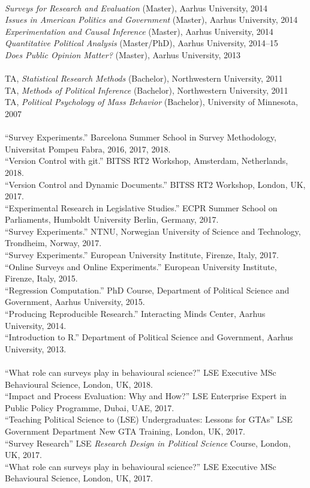 \documentclass[12pt]{article}
\newcommand{\topic}[1]{\pagebreak[3]\indent {\color{lg}{\footnotesize #1 }}\\}
\newcommand{\entry}[1]{\indent {\color{lg}\guillemotright}\hspace{2pt}#1\vspace{.25em}\\}
\begin{document}
{\topic{Lecturing: Aarhus University}
	\entry{\textit{Surveys for Research and Evaluation} (Master), Aarhus University, 2014}
	\entry{\textit{Issues in American Politics and Government} (Master), Aarhus University, 2014}
	\entry{\textit{Experimentation and Causal Inference} (Master), Aarhus University, 2014}
	\entry{\textit{Quantitative Political Analysis} (Master/PhD), Aarhus University, 2014--15}
	\entry{\textit{Does Public Opinion Matter?} (Master), Aarhus University, 2013}

\topic{Class Teaching: Northwestern University}
	\entry{TA, \textit{Statistical Research Methods} (Bachelor), Northwestern University, 2011} %
	\entry{TA, \textit{Methods of Political Inference} (Bachelor), Northwestern University, 2011} %
	\entry{TA, \textit{Political Psychology of Mass Behavior} (Bachelor), University of Minnesota, 2007} %

\topic{Short Courses}
	\entry{``Survey Experiments.'' Barcelona Summer School in Survey Methodology, Universitat Pompeu Fabra, 2016, 2017, 2018.}
	\entry{``Version Control with git.'' BITSS RT2 Workshop, Amsterdam, Netherlands, 2018.}
    \entry{``Version Control and Dynamic Documents.'' BITSS RT2 Workshop, London, UK, 2017.}
    \entry{``Experimental Research in Legislative Studies.'' ECPR Summer School on Parliaments, Humboldt University Berlin, Germany, 2017.}
    \entry{``Survey Experiments.'' NTNU, Norwegian University of Science and Technology, Trondheim, Norway, 2017.}
	\entry{``Survey Experiments.'' European University Institute, Firenze, Italy, 2017.}
	\entry{``Online Surveys and Online Experiments.'' European University Institute, Firenze, Italy, 2015.}
	\entry{``Regression Computation.'' PhD Course, Department of Political Science and Government, Aarhus University, 2015.}
	\entry{``Producing Reproducible Research.'' Interacting Minds Center, Aarhus University, 2014.}
	\entry{``Introduction to R.'' Department of Political Science and Government, Aarhus University, 2013.}

\topic{Guest Lectures}
    \entry{``What role can surveys play in behavioural science?'' LSE Executive MSc Behavioural Science, London, UK, 2018.}
    \entry{``Impact and Process Evaluation: Why and How?'' LSE Enterprise Expert in Public Policy Programme, Dubai, UAE, 2017.}
    \entry{``Teaching Political Science to (LSE) Undergraduates: Lessons for GTAs'' LSE Government Department New GTA Training, London, UK, 2017.}
    \entry{``Survey Research'' LSE \textit{Research Design in Political Science} Course, London, UK, 2017.}
    \entry{``What role can surveys play in behavioural science?'' LSE Executive MSc Behavioural Science, London, UK, 2017.}
    
}
\end{document}
